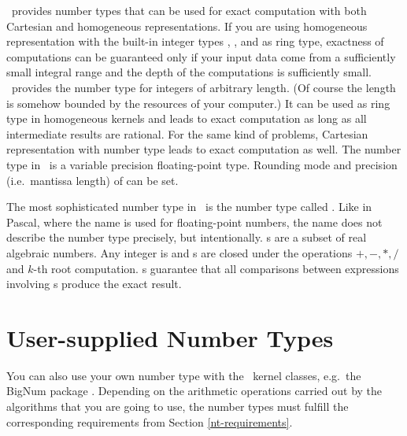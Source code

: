 \leda\ provides number types that can be used for exact computation 
with both Cartesian and homogeneous representations.  If you are using
homogeneous representation with the built-in integer types
, , and  as ring type, exactness of
computations can be guaranteed only if your input data come from a
sufficiently small integral range and the depth of the computations is
sufficiently small.  \leda\ provides the number type  for
integers of arbitrary length. (Of course the length is
somehow bounded by the resources of your computer.)  It can be used as
ring type in homogeneous kernels and leads to exact
computation as long as all intermediate results are rational.  For the
same kind of problems, Cartesian representation with number type
 leads to exact computation as well.
The number type  in \leda\ is a variable precision
floating-point type. Rounding mode and precision (i.e.\ mantissa length) of
 can be set. 

The most sophisticated number type in \leda\ is the number type called
. Like in Pascal, where the name  is used for
floating-point numbers, the name  does not describe the
number type precisely, but intentionally.  
s are a subset of real algebraic
numbers.  Any integer is  and s are closed under
the operations $+,-,*,/$ and $k$-th root computation. 
s guarantee that
all comparisons between expressions involving s produce the
exact result.


\section{User-supplied Number Types}

You can also use your own number type with the \cgal\ kernel
classes, e.g.\  the {\sc BigNum} package \cite{svh-bpepa-89}.
Depending on the arithmetic operations carried out by the algorithms
that you are going to use, the number types must fulfill the
corresponding requirements from Section \ref{nt-requirements}. 

